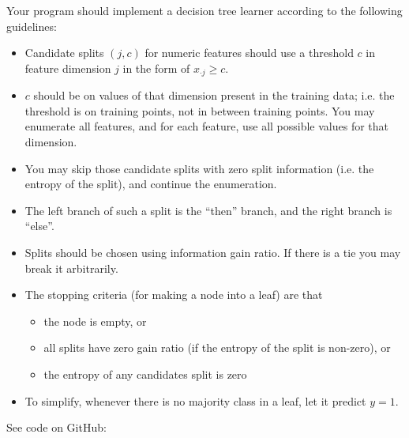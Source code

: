 \documentclass[a4paper]{article}
\theoremstyle{definition}
\newenvironment{soln}{
    \leavevmode\color{blue}\ignorespaces
}{}
\begin{document}
Your program should implement a decision tree learner according to the following guidelines:
\begin{itemize}
\item Candidate splits $(j,c)$ for numeric features should use a threshold $c$ in feature dimension $j$ in the form of $x_{\cdot j}\ge c$.
\item $c$ should be on values of that dimension present in the training data; i.e. the threshold is on training points, not in between training points. You may enumerate all features, and for each feature, use all possible values for that dimension.
\item You may skip those candidate splits with zero split information (i.e. the entropy of the split), and continue the enumeration.
\item The left branch of such a split is the ``then'' branch, and the right branch is ``else''.
\item Splits should be chosen using information gain ratio. If there is a tie you may break it arbitrarily.
\item The stopping criteria (for making a node into a leaf) are that 
	\begin{itemize}
	\item the node is empty, or
	\item all splits have zero gain ratio (if the entropy of the split is non-zero), or
	\item the entropy of any candidates split is zero
	\end{itemize}
\item To simplify, whenever there is no majority class in a leaf, let it predict $y=1$.
\end{itemize}

\begin{soln} See code on GitHub: \end{soln}
\end{document}
